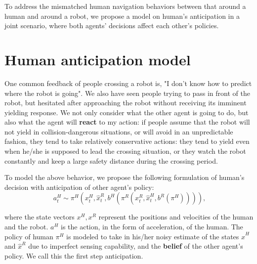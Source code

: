 \documentclass{article}
\begin{document}
To address the mismatched human navigation behaviors between that around a human and around a robot, we propose a model on human's anticipation in a joint scenario, where both agents' decisions affect each other's policies. 

\section{Human anticipation model}
One common feedback of people crossing a robot is, "I don't know how to predict where the robot is going". We also have seen people trying to pass in front of the robot, but hesitated after approaching the robot without receiving its imminent yielding response. We not only consider what the other agent is going to do, but also what the agent will \textbf{react} to my action: if people assume that the robot will not yield in collision-dangerous situations, or will avoid in an unpredictable fashion, they tend to take relatively conservative actions: they tend to yield even when he/she is supposed to lead the crossing situation, or they watch the robot constantly and keep a large safety distance during the crossing period.  

To model the above behavior, we propose the following formulation of human's decision with anticipation of other agent's policy:
\begin{equation}~\label{eq:human_decision}
a^H_t \sim \pi^H (x^H_t, \hat{x}^R_t, b^H(\pi^R (x^R_t, \hat{x}^H_t,b^R(\pi^H) ))) ,
\end{equation}

\begin{comment}
$$
p(x^H_{t+1:T}|\textbf{x}^H_{1:t},\textbf{x}^O_{1:t},\textbf{a}^O_t)
$$
$$
a^H_t \sim \pi^H (x^H_t, \hat{\textbf{x}}^O_t, b^H(\pi^O (x^O_t, \hat{\textbf{x}}^H_t,b^O(\pi^H) ))) 
$$   
$$
\pi^O_{min} = argmin_{\pi^O \in \Pi^O} V^H(x^H_t,a^H, \hat{x}^O, \pi^O)
$$
$$
a^{*H}_t = argmax_{a^H \in A^H} V^H(x^H_t, a^H ,\hat{x}^R,\pi^O_{min})
$$
$$
\gamma < \epsilon
$$
\end{comment}

where the state vectors $x^H, x^R$ represent the positions and velocities of the human and the robot. $a^H$ is the action, in the form of acceleration, of the human. The policy of human $\pi^H$ is modeled to take in his/her noisy estimate of the states $\hat{x}^H$ and $\hat{x}^R$ due to imperfect sensing capability, and the \textbf{belief} of the other agent's policy. We call this the first step anticipation. 
\end{document}
